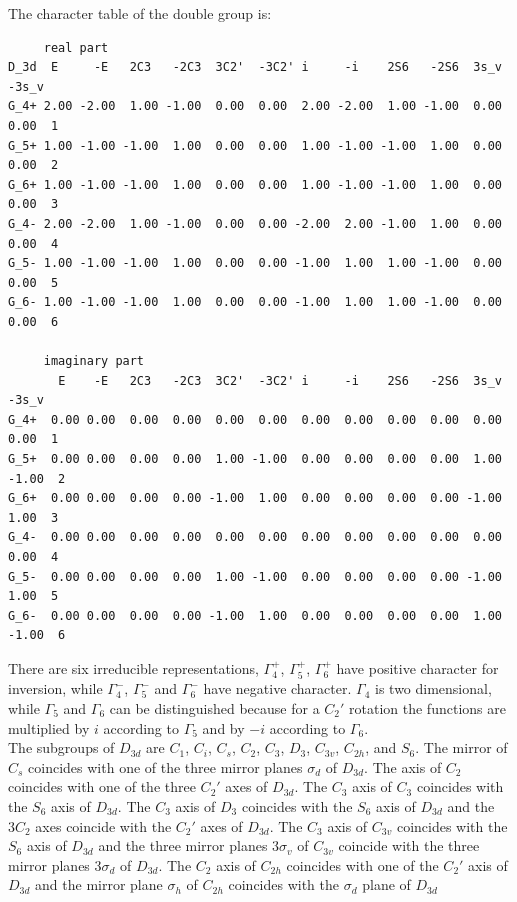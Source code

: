\documentclass[12pt,a4paper]{article}
\begin{document}
The character table of the double group is:
\begin{verbatim}
     real part
D_3d  E     -E   2C3   -2C3  3C2'  -3C2' i     -i    2S6   -2S6  3s_v  -3s_v
G_4+ 2.00 -2.00  1.00 -1.00  0.00  0.00  2.00 -2.00  1.00 -1.00  0.00  0.00  1
G_5+ 1.00 -1.00 -1.00  1.00  0.00  0.00  1.00 -1.00 -1.00  1.00  0.00  0.00  2
G_6+ 1.00 -1.00 -1.00  1.00  0.00  0.00  1.00 -1.00 -1.00  1.00  0.00  0.00  3
G_4- 2.00 -2.00  1.00 -1.00  0.00  0.00 -2.00  2.00 -1.00  1.00  0.00  0.00  4 
G_5- 1.00 -1.00 -1.00  1.00  0.00  0.00 -1.00  1.00  1.00 -1.00  0.00  0.00  5
G_6- 1.00 -1.00 -1.00  1.00  0.00  0.00 -1.00  1.00  1.00 -1.00  0.00  0.00  6

     imaginary part
       E    -E   2C3   -2C3  3C2'  -3C2' i     -i    2S6   -2S6  3s_v  -3s_v
G_4+  0.00 0.00  0.00  0.00  0.00  0.00  0.00  0.00  0.00  0.00  0.00  0.00  1
G_5+  0.00 0.00  0.00  0.00  1.00 -1.00  0.00  0.00  0.00  0.00  1.00 -1.00  2
G_6+  0.00 0.00  0.00  0.00 -1.00  1.00  0.00  0.00  0.00  0.00 -1.00  1.00  3
G_4-  0.00 0.00  0.00  0.00  0.00  0.00  0.00  0.00  0.00  0.00  0.00  0.00  4
G_5-  0.00 0.00  0.00  0.00  1.00 -1.00  0.00  0.00  0.00  0.00 -1.00  1.00  5
G_6-  0.00 0.00  0.00  0.00 -1.00  1.00  0.00  0.00  0.00  0.00  1.00 -1.00  6
\end{verbatim}
There are six irreducible representations, $\Gamma_4^+$, $\Gamma_5^+$,
$\Gamma_6^+$ have positive character for inversion, while $\Gamma_4^-$, 
$\Gamma_5^-$ and $\Gamma_6^-$ have negative character. $\Gamma_4$ is two 
dimensional, while $\Gamma_5$ and $\Gamma_6$ can be distinguished because 
for a $C_2'$ rotation the functions are multiplied by $i$ according to 
$\Gamma_5$ and by $-i$ according to $\Gamma_6$. \\
The subgroups of $D_{3d}$ are $C_1$, $C_i$, $C_s$, $C_2$, $C_3$, $D_3$, 
$C_{3v}$, $C_{2h}$, and $S_6$. The mirror of $C_s$ coincides with one
of the three mirror planes $\sigma_d$ of $D_{3d}$. The axis of $C_2$
coincides with one of the three $C_2'$ axes of $D_{3d}$. 
The $C_3$ axis of $C_3$ coincides with the $S_6$ axis of $D_{3d}$.
The $C_3$ axis of $D_3$ coincides with the $S_6$ axis of $D_{3d}$ and the
$3C_2$ axes coincide with the $C_2'$ axes of $D_{3d}$. The $C_3$ axis
of $C_{3v}$ coincides with the $S_6$ axis of $D_{3d}$ and the three
mirror planes $3\sigma_v$ of $C_{3v}$ coincide with the three mirror
planes $3\sigma_d$ of $D_{3d}$. The $C_2$ axis of 
$C_{2h}$ coincides with one of the $C_2'$ axis of $D_{3d}$ and the mirror
plane $\sigma_h$ of $C_{2h}$ coincides with the $\sigma_d$ plane of $D_{3d}$
\end{document}
